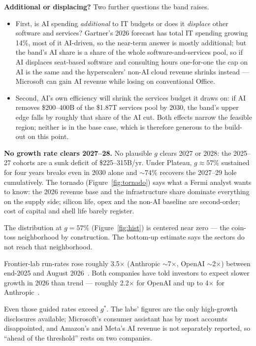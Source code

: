 \documentclass[11pt,letterpaper]{article}
\newcommand{\lead}[1]{{\color{leadwarm}\sffamily\bfseries #1}}
\begin{document}
\lead{Additional or displacing?} Two further questions the band raises.
\begin{itemize}
\item First, is AI spending \emph{additional} to IT budgets or does it \emph{displace} other software and services? Gartner's 2026 forecast has total IT spending growing 14\%, most of it AI-driven, so the near-term answer is mostly additional; but the band's AI share is a share of the whole software-and-services pool, so if AI displaces seat-based software and consulting hours one-for-one the cap on AI is the same and the hyperscalers' non-AI cloud revenue shrinks instead --- Microsoft can gain AI revenue while losing on conventional Office.
\item Second, AI's own efficiency will shrink the services budget it draws on: if AI removes \$200--400B of the \$1.87T services pool by 2030, the band's upper edge falls by roughly that share of the AI cut. Both effects narrow the feasible region; neither is in the base case, which is therefore generous to the build-out on this point.
\end{itemize} \textbf{No growth rate clears 2027--28.} No plausible $g$ clears 2027 or 2028: the 2025--27 cohorts are a sunk deficit of \$225--315B/yr. Under Plateau, $g\approx57\%$ sustained for four years breaks even in 2030 alone and $\sim$74\% recovers the 2027--29 hole cumulatively. The tornado (Figure~\ref{fig:tornado}) says what a Fermi analyst wants to know: the 2026 revenue base and the infrastructure share dominate everything on the supply side; silicon life, opex and the non-AI baseline are second-order; cost of capital and shell life barely register.

 The distribution at $g=57\%$ (Figure~\ref{fig:hist}) is centered near zero --- the coin-toss neighborhood by construction. The bottom-up estimate says the sectors do not reach that neighborhood.

\noindent\lead{Where the data stand.} Frontier-lab run-rates rose roughly 3.5$\times$ (Anthropic $\sim$7$\times$, OpenAI $\sim$2$\times$) between end-2025 and August 2026~\cite{ref:techcrunch_anthropic,ref:axios_anthropic,ref:epoch_revenue}. Both companies have told investors to expect slower growth in 2026 than trend --- roughly 2.2$\times$ for OpenAI and up to 4$\times$ for Anthropic~\cite{ref:epoch_revenue_x}.

Even those guided rates exceed $g^{*}$. The labs' figures are the only high-growth disclosures available; Microsoft's consumer assistant has by most accounts disappointed, and Amazon's and Meta's AI revenue is not separately reported, so ``ahead of the threshold'' rests on two companies.
\end{document}
